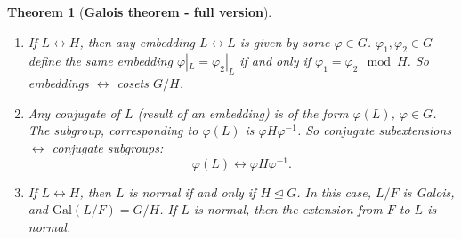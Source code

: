 \documentclass[9pt,reqno,twoside]{amsbook}
\theoremstyle{plain}
\newtheorem{theorem}{Theorem}[chapter]
\numberwithin{section}{chapter}
\numberwithin{equation}{chapter}
\theoremstyle{definition}
\theoremstyle{remark}
\theoremstyle{plain}
\newcommand{\norm}{\trianglelefteq}
\newcommand{\gal}{\mathrm{Gal}}
\renewcommand{\phi}{\varphi}
\begin{document}
\begin{theorem}[\textbf{Galois theorem - full version}]
\begin{enumerate}
\item If $L \leftrightarrow H$, then any embedding $L \leftrightarrow L$ is given by some $\phi \in G$. $\phi_1,\phi_2 \in G$ define the same embedding $\phi|_{L} = \phi_2|_L$ if and only if $\phi_1 = \phi_2 \mod H$. So embeddings $\leftrightarrow$ cosets $G/H$. 

 \item Any conjugate of $L$ (result of an embedding) is of the form $\phi(L)$, $\phi \in G$. The subgroup, corresponding to $\phi(L)$ is $\phi H \phi^{-1}$. So conjugate subextensions $\leftrightarrow$ conjugate subgroups:
$$
\phi(L) \leftrightarrow \phi H\phi^{-1}.
$$

\item If $L \leftrightarrow H$, then $L$ is normal if and only if $H \norm G$. In this case, $L/F$ is Galois, and $\gal(L/F) = G/H$. If $L$ is normal, then the extension from $F$ to $L$ is normal. 
\end{enumerate}
\end{theorem}






\backmatter








\backmatter


\printindex
\end{document}
